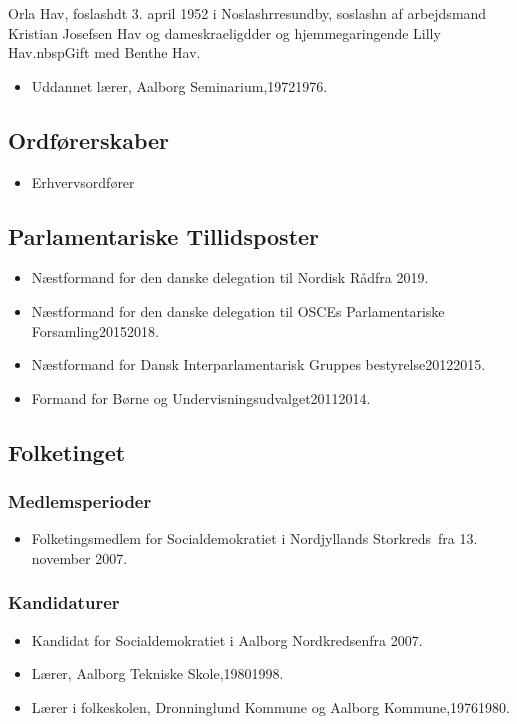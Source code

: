 \documentclass[11pt, a4paper]{awesome-cv}
\begin{document}
\makecvheader[R]
\makelettertitle
\begin{cvletter}
Orla Hav, foslashdt 3. april 1952 i Noslashrresundby, soslashn af arbejdsmand Kristian Josefsen Hav og dameskraeligdder og hjemmegaringende Lilly Hav.nbspGift med Benthe Hav.

\begin{itemize}
\item Uddannet lærer, Aalborg Seminarium,19721976.
\end{itemize}
\subsection*{Ordførerskaber}
\begin{itemize}
\item Erhvervsordfører
\end{itemize}
\subsection*{Parlamentariske Tillidsposter}
\begin{itemize}
\item Næstformand for den danske delegation til Nordisk Rådfra 2019.
\item Næstformand for den danske delegation til OSCEs Parlamentariske Forsamling20152018.
\item Næstformand for Dansk Interparlamentarisk Gruppes bestyrelse20122015.
\item Formand for Børne og Undervisningsudvalget20112014.
\end{itemize}
\subsection*{Folketinget}
\subsubsection*{Medlemsperioder}
\begin{itemize}
\item Folketingsmedlem for Socialdemokratiet i Nordjyllands Storkreds fra 13. november 2007.
\end{itemize}
\subsubsection*{Kandidaturer}
\begin{itemize}
\item Kandidat for Socialdemokratiet i Aalborg Nordkredsenfra 2007.
\end{itemize}
\begin{itemize}
\item Lærer, Aalborg Tekniske Skole,19801998.
\item Lærer i folkeskolen, Dronninglund Kommune og Aalborg Kommune,19761980.
\end{itemize}
\end{cvletter}
\end{document}
